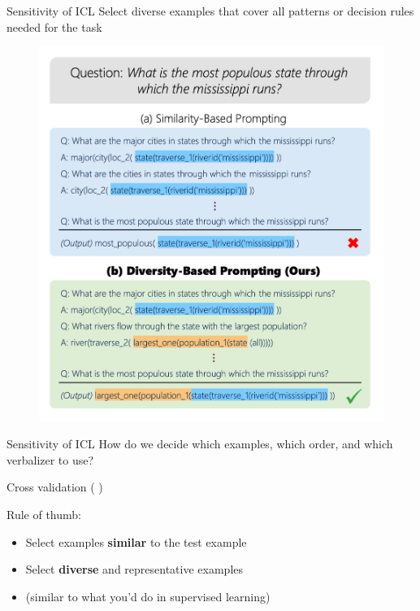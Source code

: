 \documentclass[usenames,dvipsnames,notes,11pt,aspectratio=169,hyperref={colorlinks=true, linkcolor=blue}]{beamer}
\begin{document}
\begin{frame}
    {Sensitivity of ICL}{}
    Select diverse examples that cover all patterns or decision rules needed for the task
    \begin{figure}
        \includegraphics[height=0.7\textheight]{figures/diverse-select}
    \end{figure}
\end{frame}

\begin{frame}
    {Sensitivity of ICL}
    How do we decide which examples, which order, and which verbalizer to use?\pause

    Cross validation ( \mycite{[Perez et al., 2021]})

    Rule of thumb:\\
    \begin{itemize}
        \item Select examples {\bf similar} to the test example
        \item Select {\bf diverse} and representative examples 
        \item[] (similar to what you'd do in supervised learning)
    \end{itemize}
\end{frame}
\end{document}
